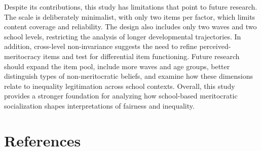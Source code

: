\documentclass[
  13pt,
]{article}
\begin{document}
Despite its contributions, this study has limitations that point to
future research. The scale is deliberately minimalist, with only two
items per factor, which limits content coverage and reliability. The
design also includes only two waves and two school levels, restricting
the analysis of longer developmental trajectories. In addition,
cross-level non-invariance suggests the need to refine
perceived-meritocracy items and test for differential item functioning.
Future research should expand the item pool, include more waves and age
groups, better distinguish types of non-meritocratic beliefs, and
examine how these dimensions relate to inequality legitimation across
school contexts. Overall, this study provides a stronger foundation for
analyzing how school-based meritocratic socialization shapes
interpretations of fairness and inequality.

\section{References}\label{references}
\end{document}
